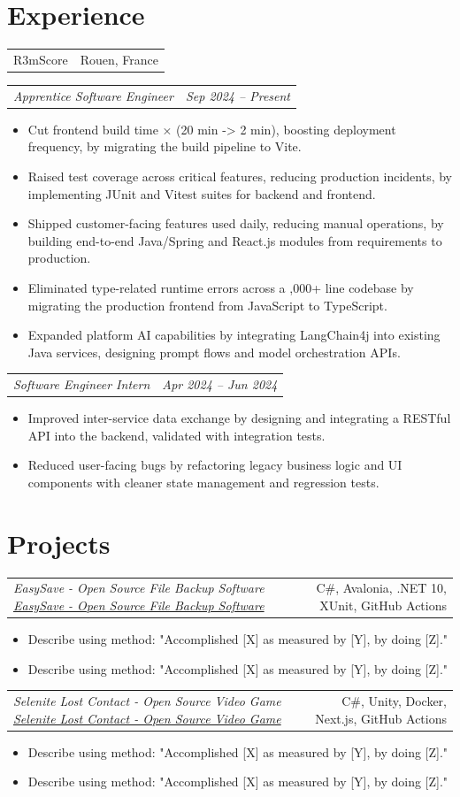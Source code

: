\documentclass[a4paper,10pt]{article}
\makeatletter
\newcommand{\embd}[1]{{\fontseries{sb}\selectfont #1}}
\newcommand{\emmd}[1]{{\fontseries{m}\selectfont #1}}
\newcommand{\resumeEntry}[2]{%
    \begin{tabular*}{\textwidth}[t]{l@{\extracolsep{\fill}}r}%
        \embd{#1} & \small #2%
    \end{tabular*}%
}
\newcommand{\resumeRole}[3][]{%
    \begin{tabular*}{\textwidth}[t]{l@{\extracolsep{\fill}}r}%
        \embd{\textit{\small #2}}\ifstrempty{#1}{}{\small\embd{\ --\  #1}} & \textit{\small #3}%
    \end{tabular*}%
}
\newcommand{\resumeItemListStart}{%
    \begin{itemize}[%
        label={\scriptsize$\bullet$},%
        leftmargin=1.5em,%
        itemsep=1pt,%
        topsep=0pt,%
        partopsep=0pt,%
        parsep=0pt%
    ]%
}
\newcommand{\resumeItemListEnd}{\end{itemize}}
\newcommand{\resumeItem}[1]{\item\small{#1}}
\newcommand{\resumeProject}[3][]{%
    \begin{tabular*}{\textwidth}[t]{l@{\extracolsep{\fill}}r}%
        \ifstrempty{#1}%
            {\embd{\small \textit{#2}}}%
            {\embd{\small \textit{\href{#1}{#2}}}\hspace{0.3em}\scalebox{0.7}{\faExternalLink*}}%
        & {\small #3}%
    \end{tabular*}%
}
\newcommand{\sectionGap}{\vspace{6pt}}
\newcommand{\innerSectionGap}{\vspace{10pt}}
\makeatother
\begin{document}
\sectionGap


\section{Experience}

\resumeEntry{R3mScore}{Rouen, France}
\resumeRole{Apprentice Software Engineer}{Sep 2024 -- Present}
\resumeItemListStart
    \resumeItem{Cut frontend build time \emmd{10× (20 min -> 2 min)}, boosting deployment frequency, by migrating the build pipeline to Vite.}
    \resumeItem{Raised test coverage across critical features, reducing production incidents, by implementing JUnit and Vitest suites for backend and frontend.}
    \resumeItem{Shipped customer-facing features used daily, reducing manual operations, by building end-to-end Java/Spring and React.js modules from requirements to production.}
    \resumeItem{Eliminated type-related runtime errors across a \emmd{15,000+ line} codebase by migrating the production frontend from JavaScript to TypeScript.}
    \resumeItem{Expanded platform AI capabilities by integrating LangChain4j into existing Java services, designing prompt flows and model orchestration APIs.}
\resumeItemListEnd

\innerSectionGap

\resumeRole{Software Engineer Intern}{Apr 2024 -- Jun 2024}
\resumeItemListStart
    \resumeItem{Improved inter-service data exchange by designing and integrating a RESTful API into the backend, validated with integration tests.}
    \resumeItem{Reduced user-facing bugs by refactoring legacy business logic and UI components with cleaner state management and regression tests.}
\resumeItemListEnd

\sectionGap


\section{Projects}

\resumeProject[https://github.com/clementmns/easysave]{EasySave - Open Source File Backup Software}{C\#, Avalonia, .NET 10, XUnit, GitHub Actions}
\resumeItemListStart
    \resumeItem{Describe using method: "Accomplished [X] as measured by [Y], by doing [Z]."}
    \resumeItem{Describe using method: "Accomplished [X] as measured by [Y], by doing [Z]."}
\resumeItemListEnd

\innerSectionGap

\resumeProject[https://github.com/selenite-live]{Selenite Lost Contact - Open Source Video Game}{C\#, Unity, Docker, Next.js, GitHub Actions}
\resumeItemListStart
    \resumeItem{Describe using method: "Accomplished [X] as measured by [Y], by doing [Z]."}
    \resumeItem{Describe using method: "Accomplished [X] as measured by [Y], by doing [Z]."}
\resumeItemListEnd
\end{document}
